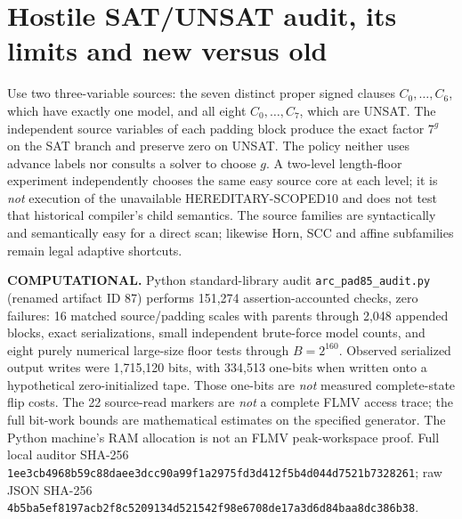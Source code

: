 \documentclass[11pt]{article}
\begin{document}
\section{Hostile SAT/UNSAT audit, its limits and new versus old}
Use two three-variable sources: the seven distinct
proper signed clauses $C_0,\ldots,C_6$, which have
exactly one model, and all eight $C_0,\ldots,C_7$,
which are UNSAT. The independent source variables
of each padding block produce the exact factor
$7^g$ on the SAT branch and preserve zero on UNSAT.
The policy neither uses advance labels nor consults
a solver to choose $g$. A two-level length-floor
experiment independently chooses the same easy
source core at each level; it is \emph{not} execution
of the unavailable HEREDITARY-SCOPED10 and does
not test that historical compiler's child semantics.
The source families are syntactically and semantically
easy for a direct scan; likewise Horn, SCC and affine
subfamilies remain legal adaptive shortcuts.

\noindent\textbf{COMPUTATIONAL.}
Python standard-library audit
\texttt{arc\_pad85\_audit.py} (renamed artifact ID 87)
performs 151,274 assertion-accounted checks, zero failures:
16 matched source/padding scales with parents through
2,048 appended blocks, exact serializations,
small independent brute-force model counts, and
eight purely numerical large-size floor tests through
$B=2^{160}$. Observed serialized output writes
were 1,715,120 bits, with 334,513 one-bits when
written onto a hypothetical zero-initialized tape.
Those one-bits are \emph{not} measured complete-state
flip costs. The 22 source-read markers are
\emph{not} a complete FLMV access trace; the
full bit-work bounds are mathematical estimates
on the specified generator. The Python machine's
RAM allocation is not an FLMV peak-workspace proof.
Full local auditor SHA-256
\texttt{1ee3cb4968b59c88daee3dcc90a99f1a2975fd3d412f5b4d044d7521b7328261};
raw JSON SHA-256
\texttt{4b5ba5ef8197acb2f8c5209134d521542f98e6708de17a3d6d84baa8dc386b38}.
\end{document}
